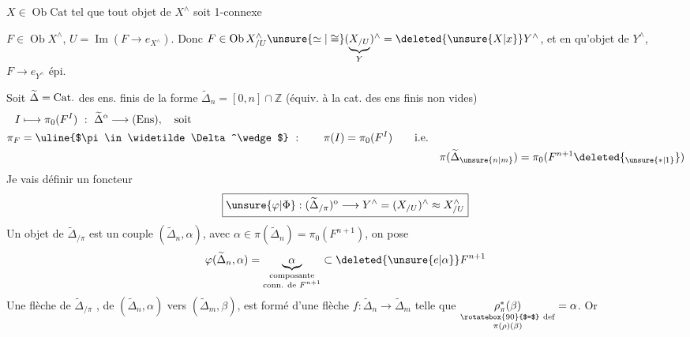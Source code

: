 $X\in\operatorname{Ob}\mathrm{Cat}$ tel que tout objet  de $X^\wedge$ soit 1-connexe

$F\in\operatorname{Ob} X^\wedge$, $U=\operatorname{Im}(F\longrightarrow e_{X^\wedge})$. Donc $F\in\operatorname{Ob}X^\wedge_{/U}\unsure{\simeq|\cong}(\underbrace{X_{/U}}_Y)^\wedge=\deleted{\unsure{X|x}}Y^\wedge$, et en  qu'objet de $Y^\wedge$, $F\longrightarrow e_{Y^\wedge}$ épi.

 Soit $\widetilde\Delta={\rm Cat.}$ des ens. finis de la forme $\widetilde\Delta_n=[0,n]\cap\mathbb Z$ (équiv. à la cat. des ens finis non vides)
\[
\begin{aligned}
 I&\longmapsto\pi_0(F^I)\ :\ \widetilde\Delta^{\mathrm o}\longrightarrow(\mathrm{Ens}),\quad\text{soit}\\
 \pi_F&=\text{\uline{$\pi\in\widetilde\Delta^\wedge$}}\ :\qquad\pi(I)=\pi_0(F^I)\qquad\text{i.e.}\\
 &&\pi(\widetilde\Delta_{\unsure{n|m}})=\pi_0(F^{n+1}\deleted{_{\unsure{*|1}}})
\end{aligned}
\]
Je vais définir un foncteur
\[
 \boxed{\unsure{\varphi|\Phi}:(\widetilde\Delta_{/\pi})^{\mathrm o}\longrightarrow Y^\wedge=(X_{/U})^\wedge\approx X^\wedge_{/U}}
\]
Un objet de $\widetilde\Delta_{/\pi}$ est un couple $(\widetilde\Delta_n,\alpha)$, avec $\alpha\in\pi(\widetilde\Delta_n)=\pi_0(F^{n+1})$, on pose
\[
 \varphi(\widetilde\Delta_n,\alpha)=\underbrace{\alpha}_{\substack{\text{composante}\\\text{conn. de }F^{n+1}}}\subset\deleted{\unsure{e|\alpha}}F^{n+1}
\]
Une flèche de $\widetilde\Delta_{/\pi}$ , de $(\widetilde\Delta_n,\alpha)$ vers $(\widetilde\Delta_m,\beta)$, est formé d'une flèche $f:\widetilde\Delta_n\longrightarrow\widetilde\Delta_m$ telle que $\underset{\substack{\rotatebox{90}{$=$}\ {\rm def}\\\pi(\rho)(\beta)}}{{\rho}_\pi^*(\beta)}=\alpha$. Or
